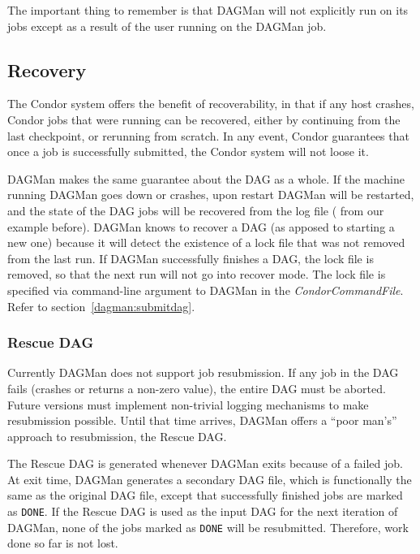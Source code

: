 The important thing to remember is that DAGMan will not explicitly run
 on its jobs except as a result of the user running  on
the DAGMan job.

\subsection{Recovery}

The Condor system offers the benefit of recoverability, in that if any host
crashes, Condor jobs that were running can be recovered, either by continuing
from the last checkpoint, or rerunning from scratch.  In any event, Condor
guarantees that once a job is successfully submitted, the Condor system will
not loose it.

DAGMan makes the same guarantee about the DAG as a whole.  If the machine
running DAGMan goes down or crashes, upon restart DAGMan will be restarted,
and the state of the DAG jobs will be recovered from the log file
( from our example before).  DAGMan knows to
recover a DAG (as apposed to starting a new one) because it will detect the
existence of a lock file that was not removed from the last run.  If DAGMan
successfully finishes a DAG, the lock file is removed, so that the next run
will not go into recover mode.  The lock file is specified via command-line
argument to DAGMan in the \textit{CondorCommandFile}.  Refer to
section~\ref{dagman:submitdag}.

\subsubsection{\label{dagman:rescue}Rescue DAG}

Currently DAGMan does not support job resubmission.  If any job in the DAG
fails (crashes or returns a non-zero value), the entire DAG must be aborted.
Future versions must implement non-trivial logging mechanisms to make
resubmission possible.  Until that time arrives, DAGMan offers a ``poor
man's'' approach to resubmission, the Rescue DAG.

The Rescue DAG is generated whenever DAGMan exits because of a failed job.  At
exit time, DAGMan generates a secondary DAG file, which is functionally the
same as the original DAG file, except that successfully finished jobs are
marked as {\tt DONE}.  If the Rescue DAG is used as the input DAG for the next
iteration of DAGMan, none of the jobs marked as {\tt DONE} will be
resubmitted.  Therefore, work done so far is not lost.

